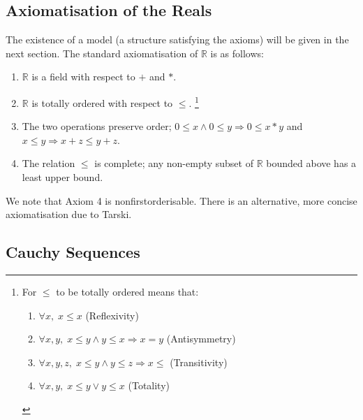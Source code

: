 \documentclass{article}
\theoremstyle{definition}
\begin{document}
\subsection{Axiomatisation of the Reals}\label{Axiomatisation of the Reals}
The existence of a model (a structure satisfying the axioms) will be given in the next section.
The standard axiomatisation of $\mathbb{R}$ is as follows:
\begin{enumerate}
	\item $\mathbb{R}$ is a field with respect to $+$ and $*$.
	\item $\mathbb{R}$ is totally ordered with respect to $\leq$.
	\footnote
	{
		For $\leq$ to be totally ordered means that:
		\begin{enumerate}
			\item $\forall x,\; x\leq x$ (Reflexivity)
			\item $\forall x,y,\; x\leq y\land y\leq x\Rightarrow x=y$ (Antisymmetry)
			\item $\forall x,y,z,\; x\leq y\land y\leq z\Rightarrow x\leq$ (Transitivity)
			\item $\forall x,y,\; x\leq y\lor y\leq x$ (Totality)
		\end{enumerate}
	}
	\item The two operations preserve order; $0\leq x\land 0\leq y\Rightarrow0\leq x*y$ and $x\leq y\Rightarrow x+z\leq y+z$.
	\item The relation $\leq$ is complete; any non-empty subset of $\mathbb{R}$ bounded above has a least upper bound.
\end{enumerate}
We note that Axiom 4 is nonfirstorderisable.
There is an alternative, more concise axiomatisation due to Tarski.

\newpage
\subsection{Cauchy Sequences}
\end{document}
